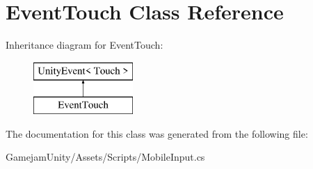 \hypertarget{class_event_touch}{}\section{Event\+Touch Class Reference}
\label{class_event_touch}
Inheritance diagram for Event\+Touch\+:\begin{figure}[H]
\begin{center}
\leavevmode
\includegraphics[height=2.000000cm]{class_event_touch}
\end{center}
\end{figure}


The documentation for this class was generated from the following file\+:\begin{DoxyCompactItemize}
\item 
Gamejam\+Unity/\+Assets/\+Scripts/Mobile\+Input.\+cs\end{DoxyCompactItemize}
